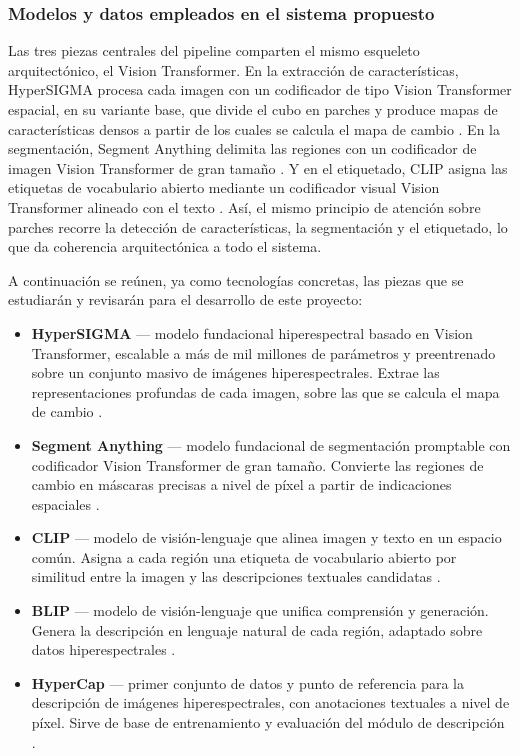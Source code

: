 \documentclass[12pt,onecolumn]{IEEEtran}
\begin{document}
\subsubsection{Modelos y datos empleados en el sistema propuesto}
Las tres piezas centrales del pipeline comparten el mismo esqueleto arquitectónico, el Vision Transformer. En la extracción de características, HyperSIGMA procesa cada imagen con un codificador de tipo Vision Transformer espacial, en su variante base, que divide el cubo en parches y produce mapas de características densos a partir de los cuales se calcula el mapa de cambio \cite{wang2024hypersigma}. En la segmentación, Segment Anything delimita las regiones con un codificador de imagen Vision Transformer de gran tamaño \cite{kirillov2023sam}. Y en el etiquetado, CLIP asigna las etiquetas de vocabulario abierto mediante un codificador visual Vision Transformer alineado con el texto \cite{radford2021clip}. Así, el mismo principio de atención sobre parches recorre la detección de características, la segmentación y el etiquetado, lo que da coherencia arquitectónica a todo el sistema.

A continuación se reúnen, ya como tecnologías concretas, las piezas que se estudiarán y revisarán para el desarrollo de este proyecto:
\begin{itemize}
    \item \textbf{HyperSIGMA} --- modelo fundacional hiperespectral basado en Vision Transformer, escalable a más de mil millones de parámetros y preentrenado sobre un conjunto masivo de imágenes hiperespectrales. Extrae las representaciones profundas de cada imagen, sobre las que se calcula el mapa de cambio \cite{wang2024hypersigma}.
    \item \textbf{Segment Anything} --- modelo fundacional de segmentación promptable con codificador Vision Transformer de gran tamaño. Convierte las regiones de cambio en máscaras precisas a nivel de píxel a partir de indicaciones espaciales \cite{kirillov2023sam}.
    \item \textbf{CLIP} --- modelo de visión-lenguaje que alinea imagen y texto en un espacio común. Asigna a cada región una etiqueta de vocabulario abierto por similitud entre la imagen y las descripciones textuales candidatas \cite{radford2021clip}.
    \item \textbf{BLIP} --- modelo de visión-lenguaje que unifica comprensión y generación. Genera la descripción en lenguaje natural de cada región, adaptado sobre datos hiperespectrales \cite{li2022blip}.
    \item \textbf{HyperCap} --- primer conjunto de datos y punto de referencia para la descripción de imágenes hiperespectrales, con anotaciones textuales a nivel de píxel. Sirve de base de entrenamiento y evaluación del módulo de descripción \cite{das2025hypercap}.
\end{itemize}
\end{document}
